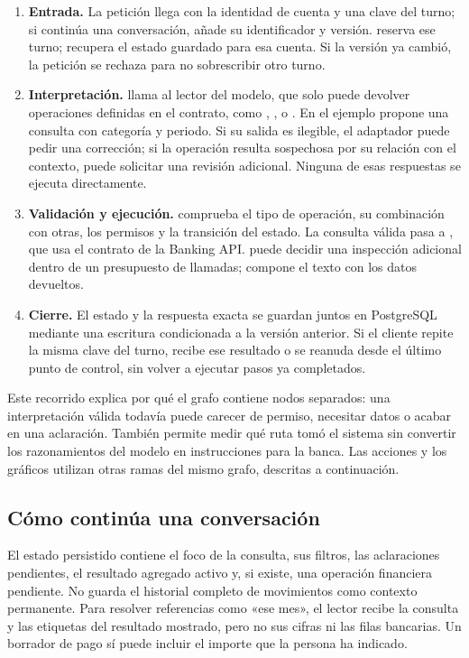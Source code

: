 \documentclass[12pt,a4paper]{article}
\begin{document}
\begin{enumerate}
\item \textbf{Entrada.} La petición llega con la identidad de cuenta y una clave del turno; si continúa una conversación, añade su identificador y versión.  reserva ese turno;  recupera el estado guardado para esa cuenta. Si la versión ya cambió, la petición se rechaza para no sobrescribir otro turno.
\item \textbf{Interpretación.}  llama al lector del modelo, que solo puede devolver operaciones definidas en el contrato, como , ,  o . En el ejemplo propone una consulta con categoría y periodo. Si su salida es ilegible, el adaptador puede pedir una corrección; si la operación resulta sospechosa por su relación con el contexto, puede solicitar una revisión adicional. Ninguna de esas respuestas se ejecuta directamente.
\item \textbf{Validación y ejecución.}  comprueba el tipo de operación, su combinación con otras, los permisos y la transición del estado. La consulta válida pasa a , que usa el contrato de la Banking API.  puede decidir una inspección adicional dentro de un presupuesto de llamadas;  compone el texto con los datos devueltos.
\item \textbf{Cierre.} El estado y la respuesta exacta se guardan juntos en PostgreSQL mediante una escritura condicionada a la versión anterior. Si el cliente repite la misma clave del turno, recibe ese resultado o se reanuda desde el último punto de control, sin volver a ejecutar pasos ya completados.
\end{enumerate}

Este recorrido explica por qué el grafo contiene nodos separados: una interpretación válida todavía puede carecer de permiso, necesitar datos o acabar en una aclaración. También permite medir qué ruta tomó el sistema sin convertir los razonamientos del modelo en instrucciones para la banca. Las acciones y los gráficos utilizan otras ramas del mismo grafo, descritas a continuación.

\subsection{Cómo continúa una conversación}
El estado persistido contiene el foco de la consulta, sus filtros, las aclaraciones pendientes, el resultado agregado activo y, si existe, una operación financiera pendiente. No guarda el historial completo de movimientos como contexto permanente. Para resolver referencias como «ese mes», el lector recibe la consulta y las etiquetas del resultado mostrado, pero no sus cifras ni las filas bancarias. Un borrador de pago sí puede incluir el importe que la persona ha indicado.
\end{document}
